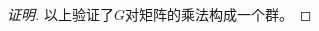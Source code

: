 \documentclass{article}
\begin{document}
\begin{CJK*}{UTF8}{gbsn}
\begin{proof}[证明]
   以上验证了$G$对矩阵的乘法构成一个群。
  
\end{proof}


\end{CJK*}
\end{document}

